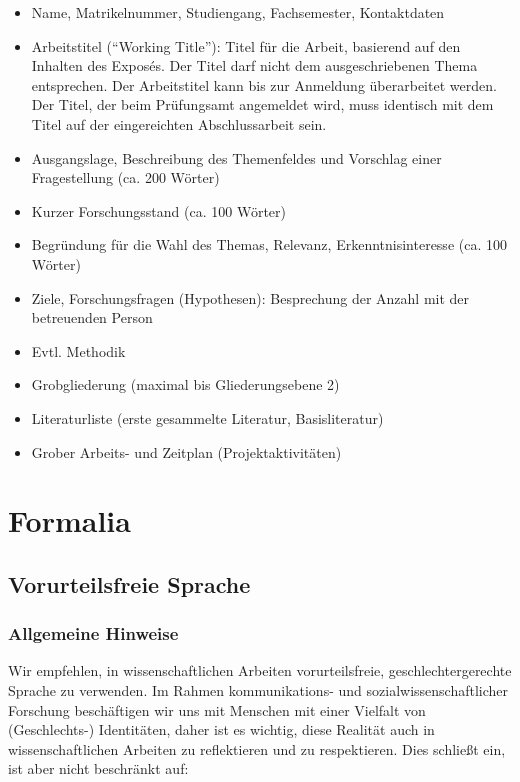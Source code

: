 \documentclass[
  letterpaper,
  DIV=11]{scrreprt}
\begin{document}
\begin{itemize}
\item
  Name, Matrikelnummer, Studiengang, Fachsemester, Kontaktdaten
\item
  Arbeitstitel (``Working Title''): Titel für die Arbeit, basierend auf
  den Inhalten des Exposés. Der Titel darf nicht dem ausgeschriebenen
  Thema entsprechen. Der Arbeitstitel kann bis zur Anmeldung
  überarbeitet werden. Der Titel, der beim Prüfungsamt angemeldet wird,
  muss identisch mit dem Titel auf der eingereichten Abschlussarbeit
  sein.
\item
  Ausgangslage, Beschreibung des Themenfeldes und Vorschlag einer
  Fragestellung (ca. 200 Wörter)
\item
  Kurzer Forschungsstand (ca. 100 Wörter)
\item
  Begründung für die Wahl des Themas, Relevanz, Erkenntnisinteresse (ca.
  100 Wörter)
\item
  Ziele, Forschungsfragen (Hypothesen): Besprechung der Anzahl mit der
  betreuenden Person
\item
  Evtl. Methodik
\item
  Grobgliederung (maximal bis Gliederungsebene 2)
\item
  Literaturliste (erste gesammelte Literatur, Basisliteratur)
\item
  Grober Arbeits- und Zeitplan (Projektaktivitäten)
\end{itemize}

\chapter{Formalia}\label{formalia}

\section{Vorurteilsfreie Sprache}\label{vorurteilsfreie-sprache}

\subsection{Allgemeine Hinweise}\label{allgemeine-hinweise-1}

Wir empfehlen, in wissenschaftlichen Arbeiten vorurteilsfreie,
geschlechtergerechte Sprache zu verwenden. Im Rahmen kommunikations- und
sozialwissenschaftlicher Forschung beschäftigen wir uns mit Menschen mit
einer Vielfalt von (Geschlechts-) Identitäten, daher ist es wichtig,
diese Realität auch in wissenschaftlichen Arbeiten zu reflektieren und
zu respektieren. Dies schließt ein, ist aber nicht beschränkt auf:
\end{document}
